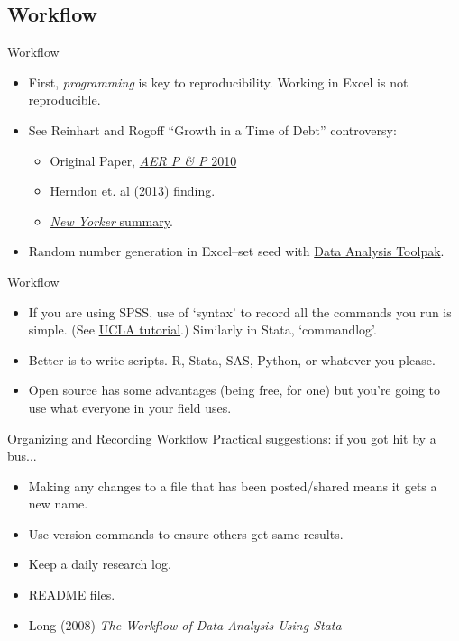 \documentclass{beamer}
\begin{document}
\subsection{Workflow}
\begin{frame}{Workflow}
\begin{itemize}
\item First, \textit{programming} is key to reproducibility. Working in Excel is not reproducible.
\item See Reinhart and Rogoff ``Growth in a Time of Debt'' controversy: 
\begin{itemize}
	\item
	Original Paper, \href{https://www.aeaweb.org/articles.php?doi=10.1257/aer.100.2.573}{\textit{AER P \& P} 2010}
	\item 
	\href{http://cje.oxfordjournals.org/content/38/2/257}{Herndon et. al (2013)} finding.
	\item \href{http://www.newyorker.com/news/john-cassidy/the-reinhart-and-rogoff-controversy-a-summing-up}{\textit{New Yorker} summary}.
\end{itemize}

\item Random number generation in Excel--set seed with \href{http://www.statisticshowto.com/use-random-number-generator-excel/}{Data Analysis Toolpak}. 
\end{itemize}
\end{frame}

\begin{frame}{Workflow}
\begin{itemize}
\item  If you are using SPSS, use of `syntax' to record all the commands you run is simple. (See \href{http://www.ats.ucla.edu/stat/spss/seminars/spss_syntax/}{UCLA tutorial}.) Similarly in Stata, `commandlog'.

\item Better is to write scripts. R, Stata, SAS, Python, or whatever you please.

\item Open source has some advantages (being free, for one) but you're going to use what everyone in your field uses.
\end{itemize}
\end{frame}

\begin{frame}{Organizing and Recording Workflow}
 Practical suggestions: if you got hit by a bus...
 \begin{itemize}
 \item Making any changes to a file that has been posted/shared means it gets a new name.
 \item Use version commands to ensure others get same results.
 \item Keep a daily research log.
 \item README files.
 \item Long (2008) \textit{The Workflow of Data Analysis Using Stata}
\end{itemize}
\end{frame}
\end{document}
